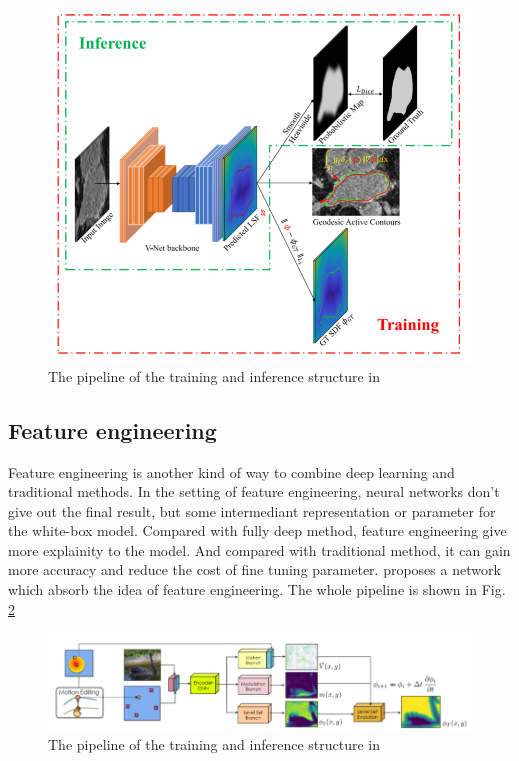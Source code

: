 \documentclass[journal]{IEEEtran}
\begin{document}
\begin{figure}[htp] 
	\centering
	\includegraphics[width=1\linewidth]{../imgs/gseg.png}%
	\caption{The pipeline of the training and inference structure in \cite{gsnake}}
	\label{fig:gseg}
\end{figure}

\subsection{Feature engineering}
Feature engineering is another kind of way to combine deep learning and traditional methods. In the setting of feature engineering, neural networks don't give out the final result, but some intermediant representation or parameter for the white-box model. Compared with fully deep method, feature engineering give more explainity to the model. And compared with traditional method, it can gain more accuracy and reduce the cost of fine tuning parameter. \cite{evlove} proposes a network which absorb the idea of feature engineering. The whole pipeline is shown in Fig. \ref{fig:evolve}

\begin{figure}[htp] 
	\centering
	\includegraphics[width=1\linewidth]{../imgs/evolve.png}%
	\caption{The pipeline of the training and inference structure in \cite{evlove}}
	\label{fig:evolve}
\end{figure}
\end{document}
